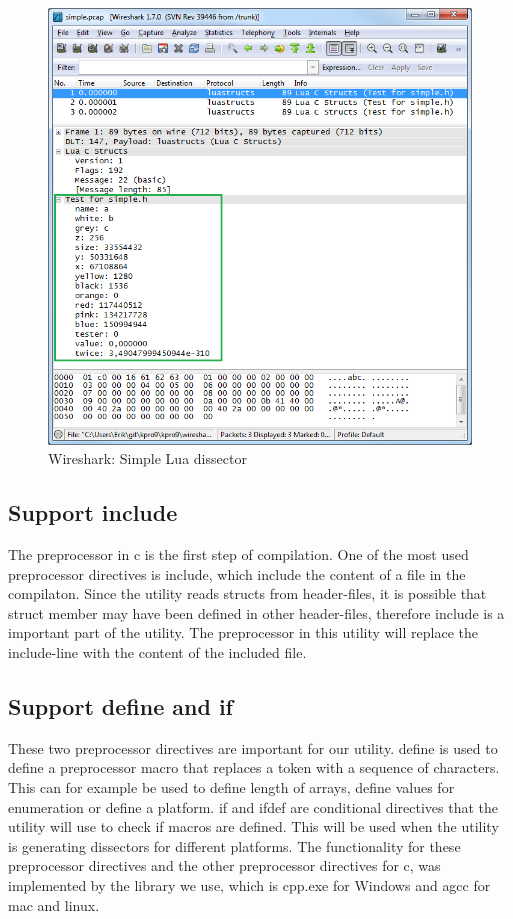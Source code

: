 \begin{figure}[ht]
	\includegraphics[width=\textwidth]{./sprints/img/wireshark_simple}
	\caption{Wireshark: Simple Lua dissector\label{fig:sp1wsstruct}}
\end{figure}

\subsection{Support \gls{include}}
The \gls{preprocessor} in \Gls{c} is the first step of compilation. One of the most used 
\gls{preprocessor} directives is \gls{include}, which include the content of a file 
in the compilaton. Since the \gls{utility} reads \glspl{struct} from \gls{header}-files, it is 
possible that \gls{struct} \gls{member} may have been defined in other \gls{header}-files, 
therefore \gls{include} is a important part of the \gls{utility}. The \gls{preprocessor} in 
this \gls{utility} will replace the \gls{include}-line with the content of the included file.

\subsection{Support \gls{define} and \gls{if}}
These two \gls{preprocessor} directives are important for our \gls{utility}. \gls{define} is 
used to define a \gls{preprocessor} macro that replaces a token with a 
sequence of characters. This can for example be used to define length of 
\glspl{array}, define values for enumeration or define a platform. \gls{if} and \gls{ifdef} 
are conditional directives that the \gls{utility} will use to check if macros are 
defined. This will be used when the \gls{utility} is generating \glspl{dissector} for 
different platforms. The functionality for these \gls{preprocessor} directives and 
the other \gls{preprocessor} directives for \Gls{c}, was implemented by the \gls{library} we 
use, which is cpp.exe for \Gls{Windows} and \gls{agcc} for \Gls{mac} and \Gls{linux}.

